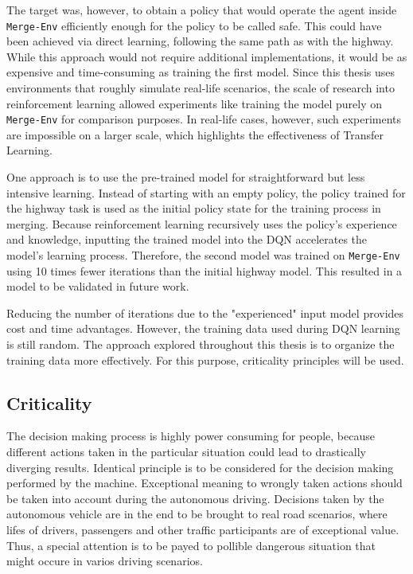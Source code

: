 The target was, however, to obtain a policy that would operate the agent inside \texttt{Merge-Env} efficiently enough for the policy to be called safe. This could have been achieved via direct learning, following the same path as with the highway. While this approach would not require additional implementations, it would be as expensive and time-consuming as training the first model. Since this thesis uses environments that roughly simulate real-life scenarios, the scale of research into reinforcement learning allowed experiments like training the model purely on \texttt{Merge-Env} for comparison purposes. In real-life cases, however, such experiments are impossible on a larger scale, which highlights the effectiveness of Transfer Learning.

One approach is to use the pre-trained model for straightforward but less intensive learning. Instead of starting with an empty policy, the policy trained for the highway task is used as the initial policy state for the training process in merging. Because reinforcement learning recursively uses the policy's experience and knowledge, inputting the trained model into the DQN accelerates the model’s learning process. Therefore, the second model was trained on \texttt{Merge-Env} using 10 times fewer iterations than the initial highway model. This resulted in a model to be validated in future work.

Reducing the number of iterations due to the "experienced" input model provides cost and time advantages. However, the training data used during DQN learning is still random. The approach explored throughout this thesis is to organize the training data more effectively. For this purpose, criticality principles will be used.

\subsection{Criticality}

The decision making process is highly power consuming for people, because different actions taken in the particular situation could lead to drastically diverging results. Identical principle is to be considered for the decision making performed by the machine. Exceptional meaning to wrongly taken actions should be taken into account during the autonomous driving. Decisions taken by the autonomous vehicle are in the end to be brought to real road scenarios, where lifes of drivers, passengers and other traffic participants are of exceptional value. Thus, a special attention is to be payed to pollible dangerous situation that might occure in varios driving scenarios. 

